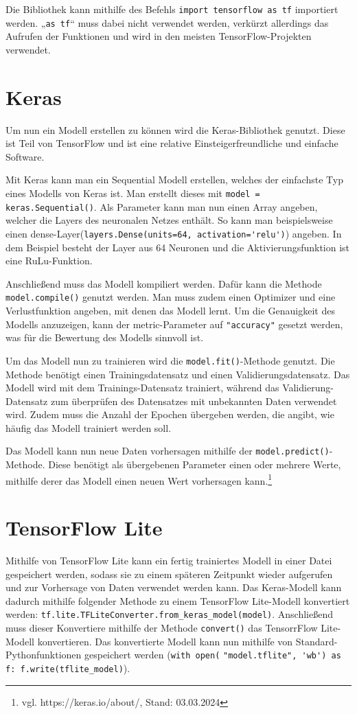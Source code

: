 \documentclass[11pt,oneside]{report}
\begin{document}
Die Bibliothek kann mithilfe des Befehls \verb+import tensorflow as tf+ importiert werden. „\verb+as tf+“ muss dabei nicht verwendet werden, verkürzt allerdings das Aufrufen der Funktionen und wird in den meisten TensorFlow-Projekten verwendet.

\section{Keras}
Um nun ein Modell erstellen zu können wird die Keras-Bibliothek genutzt. Diese ist Teil von TensorFlow und ist eine relative Einsteigerfreundliche und einfache Software.

Mit Keras kann man ein Sequential Modell erstellen, welches der einfachste Typ eines Modells von Keras ist. Man erstellt dieses mit \verb+model = keras.Sequential()+. Als Parameter kann man nun einen Array angeben, welcher die Layers des neuronalen Netzes enthält. So kann man beispielsweise einen dense-Layer(\verb+layers.Dense(units=64, activation='relu')+) angeben. In dem Beispiel besteht der Layer aus 64 Neuronen und die Aktivierungsfunktion ist eine RuLu-Funktion.

Anschließend muss das Modell kompiliert werden. Dafür kann die Methode \verb+model.compile()+ genutzt werden. Man muss zudem einen Optimizer und eine Verlustfunktion angeben, mit denen das Modell lernt. Um die Genauigkeit des Modells anzuzeigen, kann der metric-Parameter auf \verb+"accuracy"+ gesetzt werden, was für die Bewertung des Modells sinnvoll ist.

Um das Modell nun zu trainieren wird die \verb+model.fit()+-Methode genutzt. Die Methode benötigt einen Trainingsdatensatz und einen Validierungsdatensatz. Das Modell wird mit dem Trainings-Datensatz trainiert, während das Validierung-Datensatz zum überprüfen des Datensatzes mit unbekannten Daten verwendet wird. Zudem muss die Anzahl der Epochen übergeben werden, die angibt, wie häufig das Modell trainiert werden soll.

Das Modell kann nun neue Daten vorhersagen mithilfe der \verb+model.predict()+-Methode. Diese benötigt als übergebenen Parameter einen oder mehrere Werte, mithilfe derer das Modell einen neuen Wert vorhersagen kann.\footnote{vgl. https://keras.io/about/, Stand: 03.03.2024}

\section{TensorFlow Lite}
Mithilfe von TensorFlow Lite kann ein fertig trainiertes Modell in einer Datei gespeichert werden, sodass sie zu einem späteren Zeitpunkt wieder aufgerufen und zur Vorhersage von Daten verwendet werden kann. Das Keras-Modell kann dadurch mithilfe folgender Methode zu einem TensorFlow Lite-Modell konvertiert werden: \verb+tf.lite.TFLiteConverter.from_keras_model(model)+. Anschließend muss dieser Konvertiere mithilfe der Methode \verb+convert()+ das TensorrFlow Lite-Modell konvertieren. Das konvertierte Modell kann nun mithilfe von Standard-Pythonfunktionen gespeichert werden (\verb+with open(+ \verb+"model.tflite", 'wb') as f: f.write(tflite_model)+).
\end{document}
